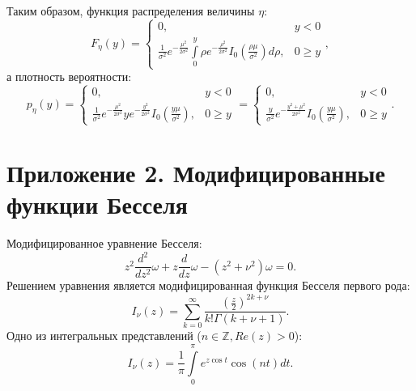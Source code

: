\documentclass[a4paper,12pt]{article}
\newcommand{\fd}[1]{ \frac{d}{d #1}}
\newcommand{\md}[2]{ \frac{d^{#1}}{d #2^{#1}}}
\begin{document}
    Таким образом, функция распределения величины $\eta$:
    \[
        F_{\eta}(y)
        = \left \{
        \begin{array}{ll}
            0,                                                                                                                                                             & y < 0   \\
            \frac{1}{\sigma^2} e^{- \frac{\mu^2}{2 \sigma^2}} \int \limits_0^y \rho e^{- \frac{\rho^2}{2 \sigma^2}} I_0 \left ( \frac{\rho \mu}{\sigma^2} \right ) d \rho, & 0 \ge y
        \end{array}
        \right .
        ,
    \]
    а плотность вероятности:
    \[
        p_{\eta}(y)
        = \left \{
        \begin{array}{ll}
            0,                                                                                                                             & y < 0   \\
            \frac{1}{\sigma^2} e^{- \frac{\mu^2}{2 \sigma^2}} y e^{- \frac{y^2}{2 \sigma^2}} I_0 \left ( \frac{y \mu}{\sigma^2} \right ) , & 0 \ge y
        \end{array}
        \right .
        = \left \{
        \begin{array}{ll}
            0,                                                                                                    & y < 0   \\
            \frac{y}{\sigma^2} e^{- \frac{y^2 + \mu^2}{2 \sigma^2}} I_0 \left ( \frac{y \mu}{\sigma^2} \right ) , & 0 \ge y
        \end{array}
        \right .
        .
    \]


    \section{Приложение 2. Модифицированные функции Бесселя}

    Модифицированное уравнение Бесселя:
    \[
        z^2 \md{2}{z} \omega + z \fd{z} \omega - ( z^2 + \nu^2 ) \omega = 0 .
    \]
    Решением уравнения является модифицированная функция Бесселя первого рода:
    \[
        I_\nu(z) = \sum_{k=0}^{\infty} \frac{\left ( \frac{z}{2} \right )^{2k+\nu}}{k! \Gamma(k+\nu+1)} .
    \]
    Одно из интегральных представлений ($n \in \mathbb{Z}, Re(z) > 0$):
    \[
        I_\nu(z) = \frac{1}{\pi} \int \limits_0^{\pi} e^{z \cos t} \cos (nt) dt .
    \]

    
\end{document}
